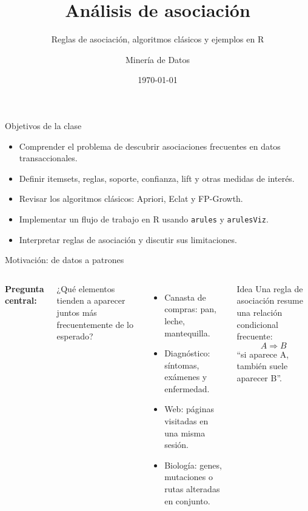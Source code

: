 \documentclass[10pt,aspectratio=169]{beamer}
\title[Análisis de asociación]{Análisis de asociación}
\subtitle{Reglas de asociación, algoritmos clásicos y ejemplos en R}
\author{Minería de Datos}
\institute{Clase práctica}
\date{\today}
\begin{document}
\begin{frame}
  \titlepage
\end{frame}

\begin{frame}{Objetivos de la clase}
\begin{itemize}
  \item Comprender el problema de descubrir asociaciones frecuentes en datos transaccionales.
  \item Definir itemsets, reglas, soporte, confianza, lift y otras medidas de interés.
  \item Revisar los algoritmos clásicos: Apriori, Eclat y FP-Growth.
  \item Implementar un flujo de trabajo en R usando \texttt{arules} y \texttt{arulesViz}.
  \item Interpretar reglas de asociación y discutir sus limitaciones.
\end{itemize}
\end{frame}

\begin{frame}{Motivación: de datos a patrones}
\begin{columns}[T]
\textbf{Pregunta central:}\vspace{0.2cm}

¿Qué elementos tienden a aparecer juntos más frecuentemente de lo esperado?

\vspace{0.3cm}
\begin{itemize}
  \item Canasta de compras: pan, leche, mantequilla.
  \item Diagnóstico: síntomas, exámenes y enfermedad.
  \item Web: páginas visitadas en una misma sesión.
  \item Biología: genes, mutaciones o rutas alteradas en conjunto.
\end{itemize}

\begin{block}{Idea}
Una regla de asociación resume una relación condicional frecuente:
\[
A \Rightarrow B
\]
``si aparece A, también suele aparecer B''.
\end{block}
\end{columns}
\end{frame}
\end{document}
